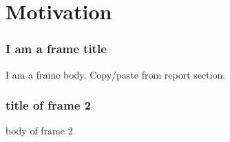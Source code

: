 
\section{Motivation}

\frame{\sectionpage}


\begin{frame} %
\frametitle{I am a frame title}
I am a frame body.
Copy/paste from report section.
\end{frame}

\begin{frame}
\frametitle{title of frame 2}
body of frame 2
\end{frame}

